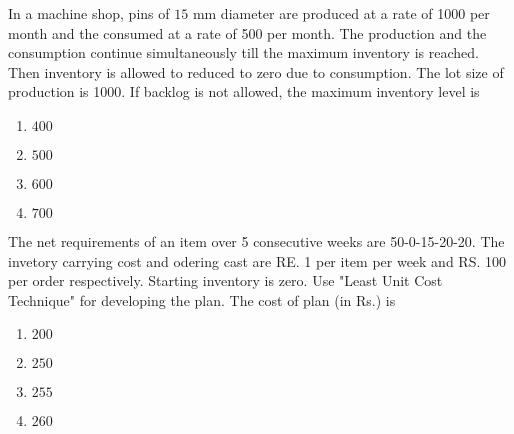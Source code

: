 \iffalse
    \author{EE24BTECH11043}
    \section{me}
    \chapter{2007}
\fi
	\item In a machine shop, pins of $15$ mm diameter are produced at a rate of 1000 per month and the consumed at a rate of 500 per month. The production and the consumption continue simultaneously till the maximum inventory is reached. Then inventory is allowed to reduced to zero due to consumption. The lot size of production is 1000. If backlog is not allowed, the maximum inventory level is 
	\begin{enumerate}
		\item $400$
		\item $500$
		\item $600$
		\item $700$
	\end{enumerate}
\item The net requirements of an item over 5 consecutive weeks are 50-0-15-20-20. The invetory carrying cost and odering cast are RE. 1 per item per week and RS. 100 per order respectively. Starting inventory is zero. Use "Least Unit Cost Technique" for developing the plan. The cost of plan (in Rs.) is 
	\begin{enumerate}
		\item $200$
		\item $250$
		\item $255$
		\item $260$
	\end{enumerate}
